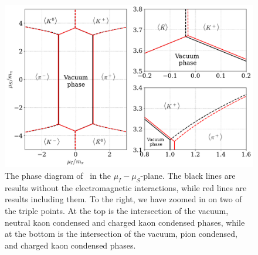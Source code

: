 \begin{figure}[!htb]
    \centering
    \includegraphics[width=.9\textwidth]{../scripts/figurer/phase_diagram_EM.pdf}
    \caption{
        The phase diagram of \chpt\ in the $\mu_I-\mu_S$-plane.
        The black lines are results without the electromagnetic interactions, while red lines are results including them. 
        To the right, we have zoomed in on two of the triple points.
        At the top is the intersection of the vacuum, neutral kaon condensed and charged kaon condensed phases, while at the bottom is the intersection of the vacuum, pion condensed, and charged kaon condensed phases.
        }
    \label{fig: phase diagram EM}
\end{figure}



